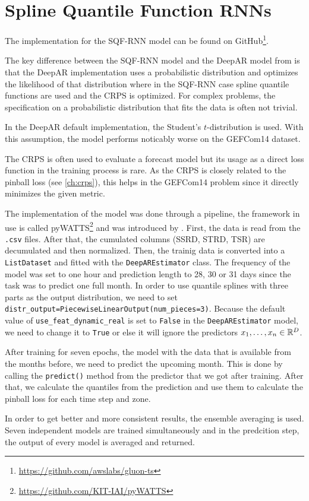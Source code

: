 \section{Spline Quantile Function RNNs}
\label{sec:implementation-sqf-rnn}

The implementation for the SQF-RNN model can be found on GitHub\footnote{\url{https://github.com/awslabs/gluon-ts}}.

The key difference between the SQF-RNN model and the DeepAR model from 
\Textcite{Salinas2017} is that the DeepAR implementation uses a 
probabilistic distribution and optimizes the likelihood of that distribution 
where in the SQF-RNN case spline quantile functions are used and the 
CRPS is optimized. 
For complex problems, the specification on a probabilistic distribution 
that fits the data is often not trivial. 

In the DeepAR default implementation, the Student's \(t\)-distribution is used. 
With this assumption, the model performs noticably worse on the GEFCom14 dataset.

The CRPS is often used to evaluate a forecast model but its usage as 
a direct loss function in the training process is rare. 
As the CRPS is closely related to the pinball loss (see \ref{ch:crps}), 
this helps in the GEFCom14 problem since it directly minimizes the given metric.

The implementation of the model was done through a pipeline, the framework in use is called
pyWATTS\footnote{\url{https://github.com/KIT-IAI/pyWATTS}} and was introduced by \Textcite{Heidrich2021}.
First, the data is read from the \texttt{.csv} files. 
After that, the cumulated columns (SSRD, STRD, TSR) are decumulated and then normalized.
Then, the trainig data is converted into a \texttt{ListDataset} and fitted with the 
\texttt{DeepAREstimator} class. The frequency of the model was set to one hour and 
prediction length to 28, 30 or 31 days since the task was to predict one full month. 
In order to use quantile splines with three parts as the output distribution, 
we need to set \texttt{distr\_output=PiecewiseLinearOutput(num\_pieces=3)}. 
Because the default value of \texttt{use\_feat\_dynamic\_real} is set to \texttt{False} 
in the \texttt{DeepAREstimator} model, 
we need to change it to \texttt{True} or else it will ignore the predictors 
\(x_1, \ldots, x_n \in \mathbb{R}^D\). 

After training for seven epochs, the model with the data that is available from the months before, 
we need to predict the upcoming month. This is done by calling the \texttt{predict()} 
method from the predictor that we got after training.
After that, we calculate the quantiles from the prediction and use them to 
calculate the pinball loss for each time step and zone.

In order to get better and more consistent results, the ensemble averaging is used. 
Seven independent models are trained simultaneously and in the predcition step, 
the output of every model is averaged and returned.
